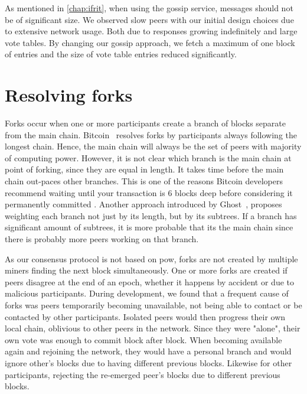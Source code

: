 \documentclass[USenglish]{uit-thesis}
\begin{document}
As mentioned in \autoref{chap:ifrit}, when using the gossip service, messages should not be of significant size.
We observed slow peers with our initial design choices due to extensive network usage.
Both due to responses growing indefinitely and large vote tables.
By changing our gossip approach, we fetch a maximum of one block of entries and the size of vote table entries reduced significantly.



\section{Resolving forks}
Forks occur when one or more participants create a branch of blocks separate from the main chain.
Bitcoin~\cite{bitcoin} resolves forks by participants always following the longest chain.
Hence, the main chain will always be the set of peers with majority of computing power.
However, it is not clear which branch is the main chain at point of forking, since they are equal in length.
It takes time before the main chain out-paces other branches.
This is one of the reasons Bitcoin developers recommend waiting until your transaction is 6 blocks deep before considering it permanently committed \cite{propa}.
Another approach introduced by Ghost~\cite{ghost}, proposes weighting each branch not just by its length, but by its subtrees.
If a branch has significant amount of subtrees, it is more probable that its the main chain since there is probably more peers working on that branch.

As our consensus protocol is not based on \gls{pow}, forks are not created by multiple miners finding the next block simultaneously. 
One or more forks are created if peers disagree at the end of an epoch, whether it happens by accident or due to malicious participants.
During development, we found that a frequent cause of forks was peers temporarily becoming unavailable, not being able to contact or be contacted by other participants.
Isolated peers would then progress their own local chain, oblivious to other peers in the network.
Since they were "alone", their own vote was enough to commit block after block.
When becoming available again and rejoining the network, they would have a personal branch and would ignore other's blocks due to having different previous blocks.
Likewise for other participants, rejecting the re-emerged peer's blocks due to different previous blocks.
\end{document}
